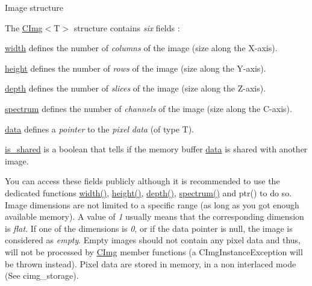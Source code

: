 \begin{DoxyParagraph}{Image structure}

\end{DoxyParagraph}
The \hyperlink{structcimg__library_1_1CImg}{CImg}$<${\ttfamily T$>$} structure contains {\itshape six\/} fields :
\begin{DoxyItemize}
\item \hyperlink{structcimg__library_1_1CImg_a369399896761e31ae71db57fdd0ba431}{width} defines the number of {\itshape columns\/} of the image (size along the X-\/axis).
\item \hyperlink{structcimg__library_1_1CImg_ae26bcfe2f33f5873dbdfb6948cf1f59f}{height} defines the number of {\itshape rows\/} of the image (size along the Y-\/axis).
\item \hyperlink{structcimg__library_1_1CImg_a3275d1392d01b26af1c8cd52b0d10745}{depth} defines the number of {\itshape slices\/} of the image (size along the Z-\/axis).
\item \hyperlink{structcimg__library_1_1CImg_acd2ee207fa512e34b45ff548082f70ba}{spectrum} defines the number of {\itshape channels\/} of the image (size along the C-\/axis).
\item \hyperlink{structcimg__library_1_1CImg_a1699472936b80a88d3fc8096975d21b2}{data} defines a {\itshape pointer\/} to the {\itshape pixel\/} {\itshape data\/} (of type {\ttfamily T}).
\item \hyperlink{structcimg__library_1_1CImg_a89c9d2adf59c941c548b2dbb85d9224d}{is\_\-shared} is a boolean that tells if the memory buffer \hyperlink{structcimg__library_1_1CImg_a1699472936b80a88d3fc8096975d21b2}{data} is shared with another image.
\end{DoxyItemize}

You can access these fields publicly although it is recommended to use the dedicated functions \hyperlink{structcimg__library_1_1CImg_a369399896761e31ae71db57fdd0ba431}{width()}, \hyperlink{structcimg__library_1_1CImg_ae26bcfe2f33f5873dbdfb6948cf1f59f}{height()}, \hyperlink{structcimg__library_1_1CImg_a3275d1392d01b26af1c8cd52b0d10745}{depth()}, \hyperlink{structcimg__library_1_1CImg_acd2ee207fa512e34b45ff548082f70ba}{spectrum()} and ptr() to do so. Image dimensions are not limited to a specific range (as long as you got enough available memory). A value of {\itshape 1\/} usually means that the corresponding dimension is {\itshape flat\/}. If one of the dimensions is {\itshape 0\/}, or if the data pointer is null, the image is considered as {\itshape empty\/}. Empty images should not contain any pixel data and thus, will not be processed by \hyperlink{structcimg__library_1_1CImg}{CImg} member functions (a CImgInstanceException will be thrown instead). Pixel data are stored in memory, in a non interlaced mode (See cimg\_\-storage).

